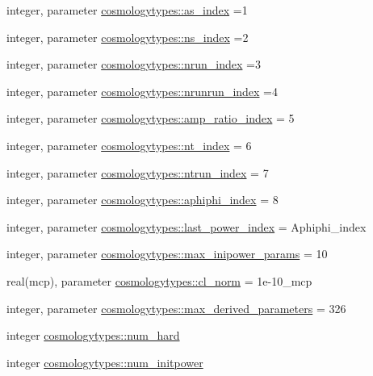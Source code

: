 \begin{DoxyCompactItemize}
\item 
integer, parameter \mbox{\hyperlink{namespacecosmologytypes_a46466f5670050f4167e8e9fbe5416298}{cosmologytypes\+::as\+\_\+index}} =1
\item 
integer, parameter \mbox{\hyperlink{namespacecosmologytypes_a94ac6353d15b78b217f2ea727a13584f}{cosmologytypes\+::ns\+\_\+index}} =2
\item 
integer, parameter \mbox{\hyperlink{namespacecosmologytypes_ae7086a888c94e02609c59f8c5fa2dbf1}{cosmologytypes\+::nrun\+\_\+index}} =3
\item 
integer, parameter \mbox{\hyperlink{namespacecosmologytypes_ab8b99958a1c9ab51eb091e6e5aab271e}{cosmologytypes\+::nrunrun\+\_\+index}} =4
\item 
integer, parameter \mbox{\hyperlink{namespacecosmologytypes_a865a3713806fafe97fbe476029dc0387}{cosmologytypes\+::amp\+\_\+ratio\+\_\+index}} = 5
\item 
integer, parameter \mbox{\hyperlink{namespacecosmologytypes_a81146d2bca96d38cce3742a77963bca3}{cosmologytypes\+::nt\+\_\+index}} = 6
\item 
integer, parameter \mbox{\hyperlink{namespacecosmologytypes_a36ff14458bf8e280f350800fc8bd0ba7}{cosmologytypes\+::ntrun\+\_\+index}} = 7
\item 
integer, parameter \mbox{\hyperlink{namespacecosmologytypes_a702869d17ac6c53907a307832df04f5b}{cosmologytypes\+::aphiphi\+\_\+index}} = 8
\item 
integer, parameter \mbox{\hyperlink{namespacecosmologytypes_a12576036de0c90fcd196839ecf951a15}{cosmologytypes\+::last\+\_\+power\+\_\+index}} = Aphiphi\+\_\+index
\item 
integer, parameter \mbox{\hyperlink{namespacecosmologytypes_a777630dc8c977e6abd38f7a7cc4652b8}{cosmologytypes\+::max\+\_\+inipower\+\_\+params}} = 10
\item 
real(mcp), parameter \mbox{\hyperlink{namespacecosmologytypes_a5f2058a68678c051e4768dd4dc91203b}{cosmologytypes\+::cl\+\_\+norm}} = 1e-\/10\+\_\+mcp
\item 
integer, parameter \mbox{\hyperlink{namespacecosmologytypes_a6d02c6eb605923549777001d9c6144ad}{cosmologytypes\+::max\+\_\+derived\+\_\+parameters}} = 326
\item 
integer \mbox{\hyperlink{namespacecosmologytypes_a570495f7e1339d51d190e98980c9b01b}{cosmologytypes\+::num\+\_\+hard}}
\item 
integer \mbox{\hyperlink{namespacecosmologytypes_aab2abf3c84749a23d7bcd331d20deacb}{cosmologytypes\+::num\+\_\+initpower}}

\end{DoxyCompactItemize}
